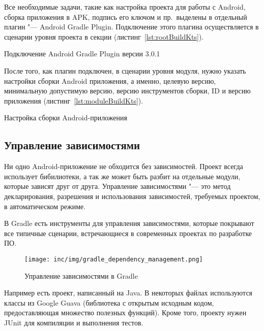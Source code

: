 Все необходимые задачи, такие как настройка проекта для работы с Android, сборка приложения в APK, подпись его ключом и пр.\ выделены в отдельный плагин "--- Android Gradle Plugin.
Подключение этого плагина осуществляется в сценарии уровня проекта в секции  (листинг~\ref{lst:rootBuildKts}).

\begin{listing}[H]
  \caption{Подключение Android Gradle Plugin версии 3.0.1}
  \label{lst:rootBuildKts}
\end{listing}

После того, как плагин подключен, в сценарии уровня модуля, нужно указать настройки сборки Android приложения, а именно, целевую версию, минимальную допустимую версию, версию инструментов сборки, ID и версию приложения (листинг~\ref{lst:moduleBuildKts}).

\begin{listing}[H]
  \caption{Настройка сборки Android-приложения}
  \label{lst:moduleBuildKts}
\end{listing}

\subsection{Управление зависимостями}
\label{subsec:libs}

Ни одно Android-приложение не обходится без зависимостей.
Проект всегда использует бибилиотеки, а так же может быть разбит на отдельные модули, которые зависят друг от друга.
Управление зависимостями "--- это метод декларирования, разрешения и использования зависимостей, требуемых проектом, в автоматическом режиме.

В Gradle есть инструменты для управления зависимостями, которые покрывают все типичные сценарии, встречающиеся в современных проектах по разработке ПО\@.

\begin{figure}[ht]
  \centering
  \texttt{[image: inc/img/gradle\_dependency\_management.png]}
  \caption{Управление зависимостями в Gradle}
  \label{fig:gradleDeps}
\end{figure}

Например есть проект, написанный на Java.
В некоторых файлах используются классы из Google Guava (библиотека с открытым исходным кодом, предоставляющая множество полезных функций).
Кроме того, проекту нужен JUnit для компиляции и выполнения тестов.

